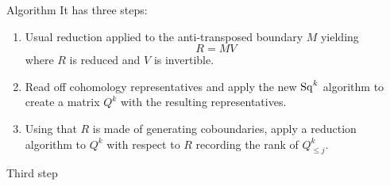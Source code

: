 \begin{frame}{Algorithm}
	\pause
	It has three steps:

	\begin{enumerate}
		\pause\bigskip
		\item Usual reduction applied to the anti-transposed boundary $M$ yielding
		\[
		R = M V
		\]
		where $R$ is reduced and $V$ is invertible.

		\pause\bigskip
		\item Read off cohomology representatives and apply the new $\operatorname{Sq}^k$ algorithm to create a matrix $Q^k$ with the resulting representatives.

		\pause\bigskip
		\item Using that $R$ is made of generating coboundaries, apply a reduction algorithm to $Q^k$ with respect to $R$ recording the rank of $Q_{\leq j}^k$.
	\end{enumerate}
\end{frame}

\begin{frame}{Third step}
	
\end{frame}

